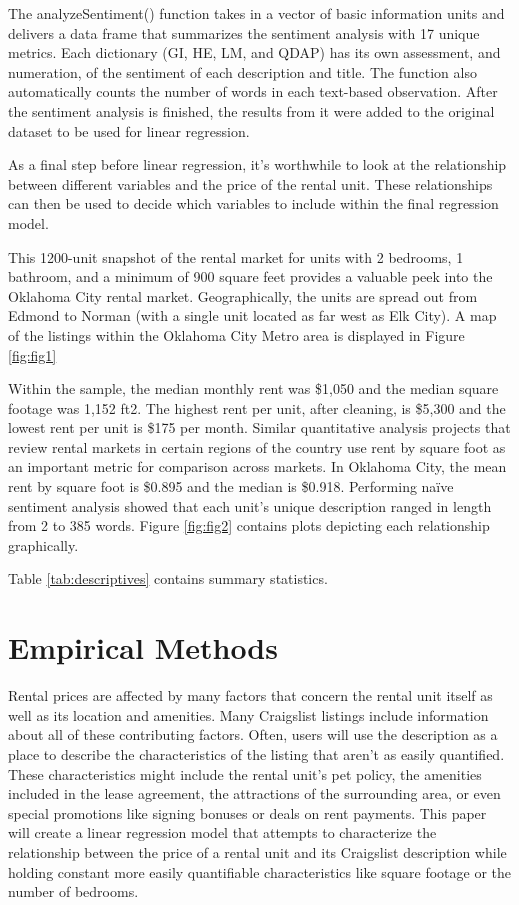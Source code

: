 \documentclass[12pt,english]{article}
\begin{document}
The analyzeSentiment() function takes in a vector of basic information units and delivers a data frame that summarizes the sentiment analysis with 17 unique metrics. Each dictionary (GI, HE, LM, and QDAP) has its own assessment, and numeration, of the sentiment of each description and title.  The function also automatically counts the number of words in each text-based observation. After the sentiment analysis is finished, the results from it were added to the original dataset to be used for linear regression. 

As a final step before linear regression, it’s worthwhile to look at the relationship between different variables and the price of the rental unit. These relationships can then be used to decide which variables to include within the final regression model. 


This 1200-unit snapshot of the rental market for units with 2 bedrooms, 1 bathroom, and a minimum of 900 square feet provides a valuable peek into the Oklahoma City rental market. Geographically, the units are spread out from Edmond to Norman (with a single unit located as far west as Elk City). A map of the listings within the Oklahoma City Metro area is displayed in Figure \ref{fig:fig1} 

Within the sample, the median monthly rent was \$1,050 and the median square footage was 1,152 ft2. The highest rent per unit, after cleaning, is \$5,300 and the lowest rent per unit is \$175 per month. Similar quantitative analysis projects that review rental markets in certain regions of the country use rent by square foot as an important metric for comparison across markets. In Oklahoma City, the mean rent by square foot is \$0.895 and the median is \$0.918. Performing naïve sentiment analysis showed that each unit’s unique description ranged in length from 2 to 385 words. Figure \ref{fig:fig2} contains plots depicting each relationship graphically. 
 

Table \ref{tab:descriptives} contains summary statistics.


\section{Empirical Methods}\label{sec:methods}

Rental prices are affected by many factors that concern the rental unit itself as well as its location and amenities. Many Craigslist listings include information about all of these contributing factors. Often, users will use the description as a place to describe the characteristics of the listing that aren’t as easily quantified. These characteristics might include the rental unit’s pet policy, the amenities included in the lease agreement, the attractions of the surrounding area, or even special promotions like signing bonuses or deals on rent payments. This paper will create a linear regression model that attempts to characterize the relationship between the price of a rental unit and its Craigslist description while holding constant more easily quantifiable characteristics like square footage or the number of bedrooms. 
\end{document}

